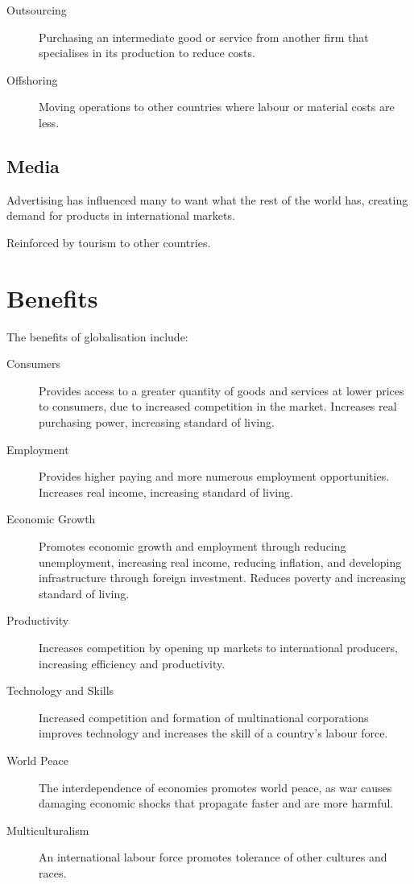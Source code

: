 \documentclass[a4paper,11pt]{article}
\begin{document}
\begin{description}
\item [Outsourcing] Purchasing an intermediate good or service from another
	firm that specialises in its production to reduce costs.
\item [Offshoring] Moving operations to other countries where labour or
	material costs are less.
\end{description}


\subsection{Media}

Advertising has influenced many to want what the rest of the world has,
creating demand for products in international markets.

Reinforced by tourism to other countries.




\section{Benefits}

The benefits of globalisation include:

\begin{description}
\item [Consumers] Provides access to a greater quantity of goods and services
	at lower prices to consumers, due to increased competition in the market.
	Increases real purchasing power, increasing standard of living.
\item [Employment] Provides higher paying and more numerous employment
	opportunities. Increases real income, increasing standard of living.
\item [Economic Growth] Promotes economic growth and employment through
	reducing unemployment, increasing real income, reducing inflation, and
	developing infrastructure through foreign investment. Reduces poverty and
	increasing standard of living.
\item [Productivity] Increases competition by opening up markets to
	international producers, increasing efficiency and productivity.
\item [Technology and Skills] Increased competition and formation of
	multinational corporations improves technology and increases the skill of a
	country's labour force.
\item [World Peace] The interdependence of economies promotes world peace, as
	war causes damaging economic shocks that propagate faster and are more
	harmful.
\item [Multiculturalism] An international labour force promotes tolerance of
	other cultures and races.
\end{description}
\end{document}
